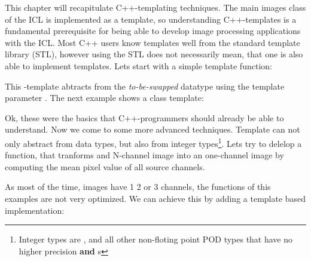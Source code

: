 This chapter will recapitulate C++-templating techniques. The main images class  of the ICL is implemented as a template, so understanding C++-templates is a fundamental prerequisite for being able to develop image processing applications with the ICL. Most C++ users know templates well from the standard template library (STL), however using the STL does not necessarily mean, that one is also able to implement templates. Lets start with a simple template function:


This -template abtracts from the \emph{to-be-swapped} datatype using the template parameter . The next example shows a class template:


Ok, these were the basics that C++-programmers should already be able to understand. Now we come to some more advanced techniques. Template can not only abstract from data types, but also from integer types\footnote{Integer types are , and all other non-floting point POD types that have no higher precision \textbf{and} s}. Lets try to delelop a function, that tranforms and N-channel image into an one-channel image by computing the mean pixel value of all source channels.


As most of the time, images have 1 2 or 3 channels, the  functions of this examples are not very optimized. We can achieve this by adding a template based implementation:


